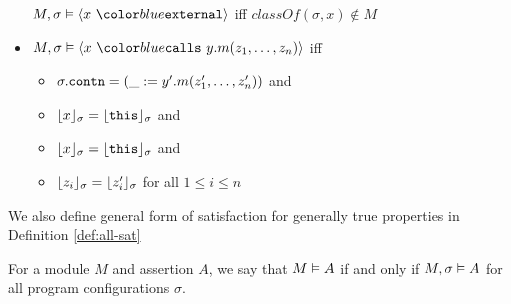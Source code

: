 \begin{definition}
\begin{itemize}
$\satisfiesA{M}{\sigma}{\external{x}}$ iff 
$\textit{classOf}(\sigma,x) \not\in M$
\item
$\satisfiesA{M}{\sigma}{\calls{x}{y}{m}{z_1, \ldots, z_n}}$ iff
\begin{itemize}
\item
$\sigma.{\texttt{contn}} = (\_ := y'.m(z'_1,\ldots,z'_n))$ and 
\item
$\lfloor x \rfloor_{\sigma} = \lfloor {\texttt{this}} \rfloor_{\sigma}$ and
\item
$\lfloor x \rfloor_{\sigma} = \lfloor {\texttt{this}} \rfloor_{\sigma}$ and
\item
$\lfloor z_i \rfloor_{\sigma} = \lfloor z'_i \rfloor_{\sigma}$ for all $1 \leq i \leq n$
\end{itemize}
\end{itemize}
\end{definition}

We also define general form of satisfaction for generally true properties in 
Definition \ref{def:all-sat}
\begin{definition}
\label{def:all-sat}
For a module $M$ and assertion $A$, we say that $M \vDash A$ if and only if
$M , \sigma \vDash A$ for all program configurations $\sigma$.
\end{definition}

	
